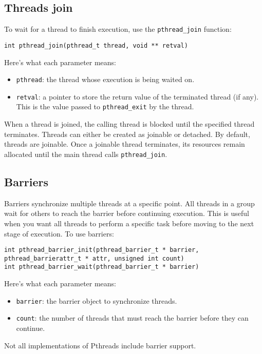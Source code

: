 \subsection{Threads join}
To wait for a thread to finish execution, use the \texttt{pthread\_join} function:
\begin{lstlisting}[style=C]
int pthread_join(pthread_t thread, void ** retval)
\end{lstlisting}
Here's what each parameter means:
\begin{itemize}
    \item \texttt{pthread}: the thread whose execution is being waited on.
    \item \texttt{retval}: a pointer to store the return value of the terminated thread (if any). 
        This is the value passed to \texttt{pthread\_exit} by the thread.
\end{itemize}
When a thread is joined, the calling thread is blocked until the specified thread terminates.
Threads can either be created as joinable or detached. 
By default, threads are joinable. 
Once a joinable thread terminates, its resources remain allocated until the main thread calls \texttt{pthread\_join}.

\subsection{Barriers}
Barriers synchronize multiple threads at a specific point. 
All threads in a group wait for others to reach the barrier before continuing execution. 
This is useful when you want all threads to perform a specific task before moving to the next stage of execution. 
To use barriers:
\begin{lstlisting}[style=C]
int pthread_barrier_init(pthread_barrier_t * barrier, pthread_barrierattr_t * attr, unsigned int count)
int pthread_barrier_wait(pthread_barrier_t * barrier)
\end{lstlisting}
Here's what each parameter means:
\begin{itemize}
    \item \texttt{barrier}: the barrier object to synchronize threads.
    \item \texttt{count}: the number of threads that must reach the barrier before they can continue.
\end{itemize}
Not all implementations of Pthreads include barrier support.

